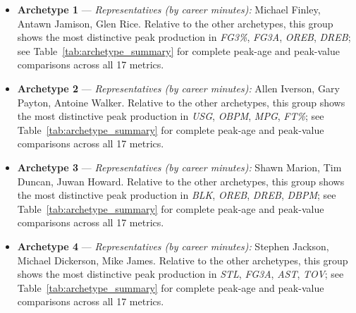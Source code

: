 \begin{itemize}
\item \textbf{Archetype 1} --- \emph{Representatives (by career minutes):} Michael Finley, Antawn Jamison, Glen Rice. Relative to the other archetypes, this group shows the most distinctive peak production in \textit{FG3\%}, \textit{FG3A}, \textit{OREB}, \textit{DREB}; see Table~\ref{tab:archetype_summary} for complete peak-age and peak-value comparisons across all 17 metrics.
\item \textbf{Archetype 2} --- \emph{Representatives (by career minutes):} Allen Iverson, Gary Payton, Antoine Walker. Relative to the other archetypes, this group shows the most distinctive peak production in \textit{USG}, \textit{OBPM}, \textit{MPG}, \textit{FT\%}; see Table~\ref{tab:archetype_summary} for complete peak-age and peak-value comparisons across all 17 metrics.
\item \textbf{Archetype 3} --- \emph{Representatives (by career minutes):} Shawn Marion, Tim Duncan, Juwan Howard. Relative to the other archetypes, this group shows the most distinctive peak production in \textit{BLK}, \textit{OREB}, \textit{DREB}, \textit{DBPM}; see Table~\ref{tab:archetype_summary} for complete peak-age and peak-value comparisons across all 17 metrics.
\item \textbf{Archetype 4} --- \emph{Representatives (by career minutes):} Stephen Jackson, Michael Dickerson, Mike James. Relative to the other archetypes, this group shows the most distinctive peak production in \textit{STL}, \textit{FG3A}, \textit{AST}, \textit{TOV}; see Table~\ref{tab:archetype_summary} for complete peak-age and peak-value comparisons across all 17 metrics.
\end{itemize}
